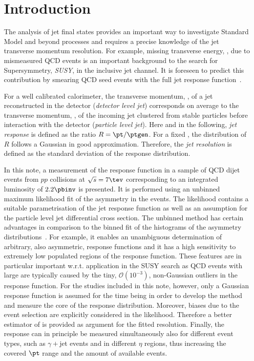 

\section{Introduction}

The analysis of jet final states provides an important way to investigate Standard Model and beyond processes and requires a precise knowledge of the jet transverse momentum resolution.
For example, missing transverse energy, \met, due to mismeasured QCD events is an important background to the search for Supersymmetry, \textit{SUSY}, in the inclusive jet channel.
It is foreseen to predict this contribution by smearing QCD seed events with the full jet response function~\cite{bib:ra2}.

For a well calibrated calorimeter, the transverse momentum, \pt, of a jet reconstructed in the detector (\textit{detector level jet}) corresponds on average to the transverse momentum, \ptgen, of the incoming jet clustered from stable particles before interaction with the detector (\textit{particle level jet}).
Here and in the following, \textit{jet \pt response} is defined as the ratio \mbox{$R = \pt/\ptgen$}.
For a fixed \ptgen, the distribution of $R$ follows a Gaussian in good approximation.
Therefore, the \textit{jet \pt resolution} is defined as the standard deviation of the response distribution. 

In this note, a measurement of the response function in a sample of QCD dijet events from $pp$ collisions at \mbox{$\sqrt{s} = 7\tev$} corresponding to an integrated luminosity of $2.2\pbinv$ is presented.
It is performed using an unbinned maximum likelihood fit of the \pt asymmetry in the events.
The likelihood contains a suitable parametrisation of the jet \pt response function as well as an assumption for the particle level jet differential cross section.
The unbinned method has certain advantages in comparison to the binned fit of the histograms of the asymmetry distributions~\cite{bib:asym}.
For example, it enables an unambiguous determination of arbitrary, also asymmetric, response functions and it has a high sensitivity to extremely low populated regions of the response function.
These features are in particular important w.r.t. application in the SUSY search as QCD events with large \met are typically caused by the tiny, $\mathcal{O}(10^{-3})$, non-Gaussian outliers in the response function.
For the studies included in this note, however, only a Gaussian response function is assumed for the time being in order to develop the method and measure the core of the response distribution.
Moreover, biases due to the event selection are explicitly considered in the likelihood.
Therefore a better estimator of \ptgen is provided as argument for the fitted resolution.
Finally, the response can in principle be measured simultaneously also for different event types, such as $\gamma+$jet events and in different $\eta$ regions, thus increasing the covered $\pt$ range and the amount of available events.

